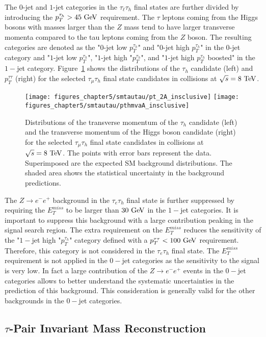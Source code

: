 The $0$-jet and $1$-jet categories in the $\tau_{\ell}\tau_{h}$ final states are further divided by introducing the $p_{T}^{\tau_h}>45~\mathrm{Ge\kern -0.1em V}$ requirement. The $\tau$ leptons coming from the Higgs bosons with masses larger than the $Z$ mass tend to have larger transverse momenta compared to the tau leptons coming from the $Z$ boson. The resulting categories are denoted as the "$0$-jet low $p_{T}^{\tau_h}$" and "$0$-jet high $p_{T}^{\tau_h}$" in the $0$-jet category and  "$1$-jet low $p_{T}^{\tau_h}$", "$1$-jet high "$p_{T}^{\tau_h}$", and "$1$-jet high $p_{T}^{\tau_h}$ boosted" in the $1-$jet category. Figure~\ref{fig:higgspt} shows the distributions of the $\tau_{h}$ candidate (left) and $p_{T}^{\tau\tau} $ (right) for the selected $\tau_{\mu}\tau_{h}$ final state candidates in collisions at $\sqrt{s}=8~\mathrm{Te\kern -0.1em V}$. 
\begin{figure}[htbp]
\centering
\texttt{[image: figures\_chapter5/smtautau/pt\_2A\_insclusive]}
\texttt{[image: figures\_chapter5/smtautau/pthmvaA\_insclusive]}
\caption{Distributions of the transverse momentum of the $\tau_{h}$ candidate (left)  and the transverse momentum of the Higgs boson candidate (right) for the selected $\tau_{\mu}\tau_{h}$ final state candidates in collisions at $\sqrt{s}=8~\mathrm{Te\kern -0.1em V}$. The points with error bars represent the data. Superimposed are the expected SM background distributions. The shaded area shows the statistical uncertainty in the background predictions.}
\label{fig:higgspt}
\end{figure}
The $Z\rightarrow e^{-}e^{+}$ background in the $\tau_{e}\tau_h$ final state is further suppressed by requiring the $E_{T}^{miss}$ to be larger than $30~\mathrm{Ge\kern -0.1em V}$ in the $1-$jet categories. It is important to suppress this background with a large contribution peaking in the signal search region. The extra requirement on the $E_{T}^{miss}$ reduces the sensitivity of the "$1-$jet high "$p_{T}^{\tau_h}$" category defined with a $p_{T}^{\tau\tau}<100~\mathrm{Ge\kern -0.1em V}$ requirement. Therefore, this category is not considered in the $\tau_e\tau_h$ final state. The $E_{T}^{miss}$ requirement is not applied in the $0-$jet categories as the sensitivity to the signal is very low. In fact a large contribution of the $Z\rightarrow e^{-}e^{+}$ events in the $0-$jet categories allows to better understand the systematic uncertainties in the prediction of this background. This consideration is generally valid for the other backgrounds in the $0-$jet categories.

\subsection{$\tau$-Pair Invariant Mass Reconstruction}

